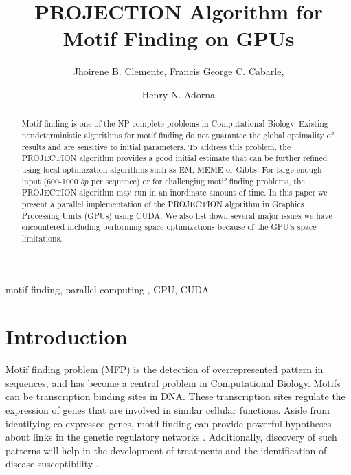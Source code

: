 \documentclass{llncs}
\title{PROJECTION Algorithm for Motif Finding on GPUs}
\author{Jhoirene B. Clemente, Francis George C. Cabarle, \and Henry N. Adorna}
\institute{Algorithms \& Complexity Lab\\
Department of Computer Science\\
University of the Philippines Diliman\\
sDiliman 1101 Quezon City, Philippines\\
E-mail: \tt{\{jbclemente, fccabarle, hnadorna\}@up.edu.ph } }
\newenvironment{keywords}{
       \list{}{\advance\topsep by0.35cm\relax\small
       \leftmargin=1cm
       \labelwidth=0.35cm
       \listparindent=0.35cm
       \itemindent\listparindent
       \rightmargin\leftmargin}\item[\hskip\labelsep
                                     \bfseries Keywords:]}
     {\endlist}
\begin{document}
	
\maketitle

\begin{abstract}
Motif finding is one of the NP-complete problems in Computational Biology. Existing nondeterministic algorithms for motif finding do not guarantee the global optimality of results and are sensitive to initial parameters. To address this problem, the PROJECTION algorithm provides a good initial estimate that can be  further refined using local optimization algorithms such as EM, MEME or Gibbs. For large enough input (600-1000 $bp$ per sequence) or for challenging motif finding problems, the PROJECTION algorithm may run  in an inordinate amount of time. In this paper we present a parallel implementation of the PROJECTION algorithm in  Graphics Processing Units (GPUs) using CUDA. We also list down several major issues we have encountered including  performing  space optimizations because of the GPU's space limitations.
\end{abstract}
\begin{keywords}
motif finding, parallel computing , GPU, CUDA
\end{keywords}
		
\section{Introduction}\label{intro}


Motif finding problem (MFP) is the detection of overrepresented pattern  in sequences, and has become  a central problem in Computational Biology. Motifs can be transcription binding sites in DNA. These transcription sites regulate the expression of genes that are involved in similar cellular functions. Aside from identifying co-expressed genes,  motif finding can provide powerful hypotheses about links in the genetic regulatory networks \cite{manson}. Additionally, discovery of such patterns will help in the development of treatments and the identification of disease susceptibility \cite{shashidhara}.
\end{document}
